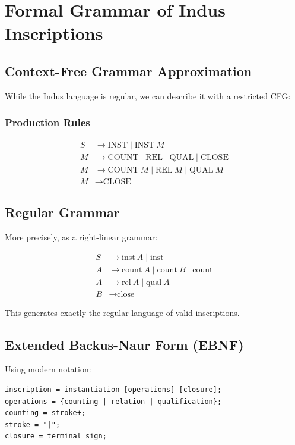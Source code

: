 \section{Formal Grammar of Indus Inscriptions}

\subsection{Context-Free Grammar Approximation}

While the Indus language is regular, we can describe it with a restricted CFG:

\subsubsection{Production Rules}
\begin{align*}
S &\rightarrow \text{INST} \mid \text{INST}~M \\
M &\rightarrow \text{COUNT} \mid \text{REL} \mid \text{QUAL} \mid \text{CLOSE} \\
M &\rightarrow \text{COUNT}~M \mid \text{REL}~M \mid \text{QUAL}~M \\
M &\rightarrow \text{CLOSE}
\end{align*}

\subsection{Regular Grammar}

More precisely, as a right-linear grammar:

\begin{align*}
S &\rightarrow \text{inst}~A \mid \text{inst} \\
A &\rightarrow \text{count}~A \mid \text{count}~B \mid \text{count} \\
A &\rightarrow \text{rel}~A \mid \text{qual}~A \\
B &\rightarrow \text{close}
\end{align*}

This generates exactly the regular language of valid inscriptions.

\subsection{Extended Backus-Naur Form (EBNF)}

Using modern notation:
\begin{verbatim}
inscription = instantiation [operations] [closure];
operations = {counting | relation | qualification};
counting = stroke+;
stroke = "|";
closure = terminal_sign;
\end{verbatim}

